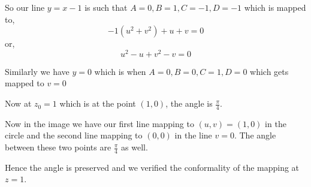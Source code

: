 \documentclass[a4paper]{report}
\begin{document}
So our line $y = x - 1$ is such that $A = 0, B = 1, C = -1, D = -1$ which is mapped to, 
$$ -1(u^2 + v^2) + u + v = 0 $$ or, 
$$ u^2 - u + v^2 - v = 0 $$ 

Similarly we have $y = 0$ which is when $A = 0, B = 0, C = 1, D = 0$ which gets mapped to $v = 0$

Now at  $z_0 = 1$ which is at the point $(1,0)$, the angle is $\frac{\pi}{4}$. 

Now in the image we have our first line mapping to  $(u,v) = (1,0)$ in the circle and the second line mapping to $(0,0)$ in the line $v = 0$. The angle between these two points are  $\frac{\pi}{4}$ as well.

Hence the angle is preserved and we verified the conformality of the mapping at $z = 1$.

            
\end{document}
